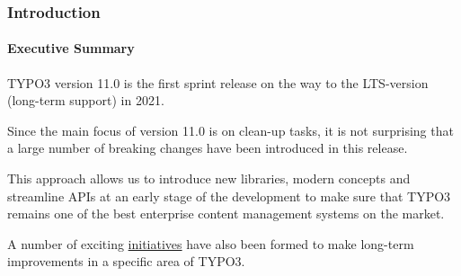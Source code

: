 %

\begin{frame}[fragile]
	\frametitle{Introduction}
	\framesubtitle{Executive Summary}

	\small
		TYPO3 version 11.0 is the first sprint release on the way to the LTS-version
		(long-term support) in 2021.

		\vspace{0.2cm}

		Since the main focus of version 11.0 is on clean-up tasks, it is not surprising
		that a large number of breaking changes have been introduced in this release.

		\vspace{0.2cm}

		This approach allows us to introduce new libraries, modern concepts and
		streamline APIs at an early stage of the development to make sure that TYPO3
		remains one of the best enterprise content management systems on the market.

		\vspace{0.2cm}

		A number of exciting
		\href{https://typo3.org/community/teams/typo3-development/initiatives/}{initiatives}
		have also been formed to make long-term improvements in a specific area of
		TYPO3.
	\normalsize

\end{frame}

